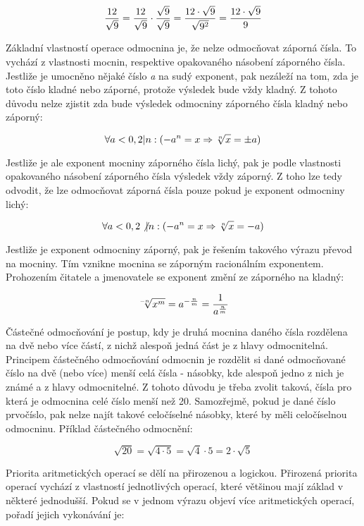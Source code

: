 $$ {12 \over \sqrt{9}} = {12 \over \sqrt{9}} \cdot {\sqrt{9} \over \sqrt{9}} = {12 \cdot \sqrt{9} \over \sqrt{9^2}} = {12 \cdot \sqrt{9} \over 9} $$


Základní vlastností operace odmocnina je, že nelze odmocňovat záporná čísla. To vychází z vlastnosti mocnin, respektive opakovaného násobení záporného čísla. Jestliže je umocněno nějaké číslo {\it a} na sudý exponent, pak nezáleží na tom, zda je toto číslo kladné nebo záporné, protože výsledek bude vždy kladný. Z tohoto důvodu nelze zjistit zda bude výsledek odmocniny záporného čísla kladný nebo záporný:

$$ \forall a < 0, 2|n: (-a^n = x \Rightarrow \root n\of{x} = \pm a) $$


Jestliže je ale exponent mocniny záporného čísla lichý, pak je podle vlastnosti opakovaného násobení záporného čísla výsledek vždy záporný. Z toho lze tedy odvodit, že lze odmocňovat záporná čísla pouze pokud je exponent odmocniny lichý:

$$ \forall a < 0, 2 \not | n: (-a^n = x \Rightarrow \root n\of{x} = - a) $$


Jestliže je exponent odmocniny záporný, pak je řešením takového výrazu převod na mocniny. Tím vznikne mocnina se záporným racionálním exponentem. Prohozením čitatele a jmenovatele se exponent změní ze záporného na kladný:

$$ \root -n\of{x^m} = a^{-{n\over m}} = {1 \over a^{{n\over m}}} $$



Částečné odmocňování je postup, kdy je druhá mocnina daného čísla rozdělena na dvě nebo více částí, z nichž alespoň jedná část je z hlavy odmocnitelná. Principem částečného odmocňování odmocnin je rozdělit si dané odmocňované číslo na dvě (nebo více) menší celá čísla - násobky, kde alespoň jedno z nich je známé a z hlavy odmocnitelné. Z tohoto důvodu je třeba zvolit taková, čísla pro která je odmocnina celé číslo menší než 20. Samozřejmě, pokud je dané číslo prvočíslo, pak nelze najít takové celočíselné násobky, které by měli celočíselnou odmocninu. Příklad částečného odmocnění:

$$ \sqrt {20} = \sqrt{4\cdot5} = \sqrt{4} \cdot {5} = 2 \cdot \sqrt{5} $$


Priorita aritmetických operací se dělí na přirozenou a logickou. Přirozená priorita operací vychází z vlastností jednotlivých operací, které většinou mají základ v některé jednodušší. Pokud se v jednom výrazu objeví více aritmetických operací, pořadí jejich vykonávání je:

